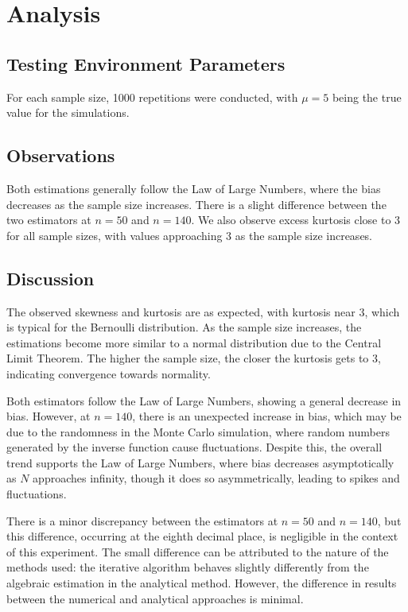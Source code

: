 \documentclass{report}
\begin{document}
\section{Analysis}

\subsection{Testing Environment Parameters}
For each sample size, 1000 repetitions were conducted, with \(\mu = 5\) being the true value for the simulations.


\subsection{Observations}
Both estimations generally follow the Law of Large Numbers, where the bias decreases as the sample size increases.
There is a slight difference between the two estimators at \(n = 50\) and \(n = 140\).
We also observe excess kurtosis close to 3 for all sample sizes, with values approaching 3 as the sample size increases.


\subsection{Discussion}
The observed skewness and kurtosis are as expected, with kurtosis near 3, which is typical for the Bernoulli distribution.
As the sample size increases, the estimations become more similar to a normal distribution due to the Central Limit Theorem.
The higher the sample size, the closer the kurtosis gets to 3, indicating convergence towards normality.

Both estimators follow the Law of Large Numbers, showing a general decrease in bias.
However, at \(n = 140\), there is an unexpected increase in bias, which may be due to the randomness in the Monte Carlo simulation, where random numbers generated by the inverse function cause fluctuations.
Despite this, the overall trend supports the Law of Large Numbers, where bias decreases asymptotically as \(N\) approaches infinity, though it does so asymmetrically, leading to spikes and fluctuations.

There is a minor discrepancy between the estimators at \(n = 50\) and \(n = 140\), but this difference, occurring at the eighth decimal place, is negligible in the context of this experiment.
The small difference can be attributed to the nature of the methods used: the iterative algorithm behaves slightly differently from the algebraic estimation in the analytical method. However, the difference in results between the numerical and analytical approaches is minimal.
\end{document}
